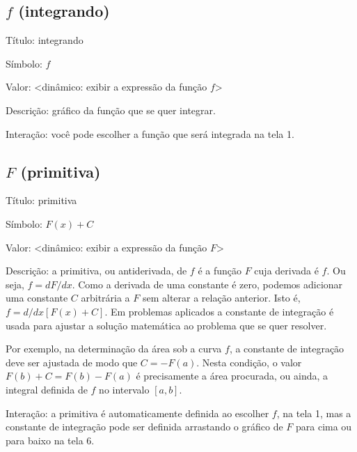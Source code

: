 \documentclass[a4paper,10pt]{scrartcl}
\begin{document}
  \subsection*{$f$ (integrando)}
    \begin{compactdesc}
	\item{Título:} integrando
	\item{Símbolo:} $f$
	\item{Valor:} <dinâmico: exibir a expressão da função $f$>
	\item{Descrição:} gráfico da função que se quer integrar.
	\item{Interação:} você pode escolher a função que será integrada na tela 1.
    \end{compactdesc}
    
  \newpage
    
  \subsection*{$F$ (primitiva)}
    \begin{compactdesc}
	\item{Título:} primitiva
	\item{Símbolo:} $F(x)+C$
	\item{Valor:} <dinâmico: exibir a expressão da função $F$>
	\item{Descrição:} a primitiva, ou antiderivada, de $f$ é a função $F$ cuja derivada é $f$. Ou seja, $f = dF/dx$. Como a derivada de uma constante é zero, podemos adicionar uma constante $C$ arbitrária a $F$ sem alterar a relação anterior. Isto é, $f = d/dx [F(x)+C]$. Em problemas aplicados a constante de integração é usada para ajustar a solução matemática ao problema que se quer resolver.
	
	Por exemplo, na determinação da área sob a curva $f$, a constante de integração deve ser ajustada de modo que $C = -F(a)$. Nesta condição, o valor $F(b)+C = F(b)-F(a)$ é precisamente a área procurada, ou ainda, a integral definida de $f$ no intervalo $[a,b]$.
	\item{Interação:} a primitiva é automaticamente definida ao escolher $f$, na tela 1, mas a constante de integração pode ser definida arrastando o gráfico de $F$ para cima ou para baixo na tela 6.
    \end{compactdesc}
    
  
    
\end{document}
